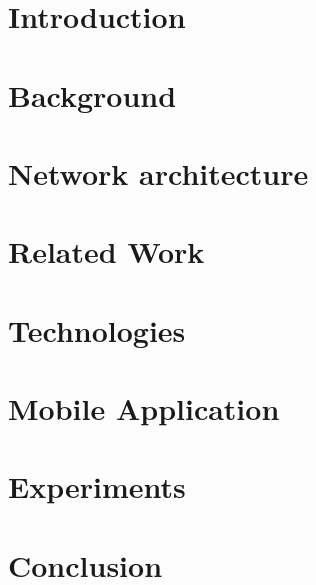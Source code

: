 \documentclass[english, a4paper, 11pt, twoside]{article}
\numberwithin{equation}{section} %
\begin{document}
\section{Introduction} %
\clearpage %

\section{Background}
    
\clearpage

\section{Network architecture}
    
\clearpage

\section{Related Work}
    
\clearpage

\section{Technologies}
    
\clearpage

\section{Mobile Application}
    
\clearpage
  
\section{Experiments}
    
\clearpage

\section{Conclusion}
    
\clearpage

\newpage
\renewcommand\refname{References} %
{ %
}


%     
\end{document}
